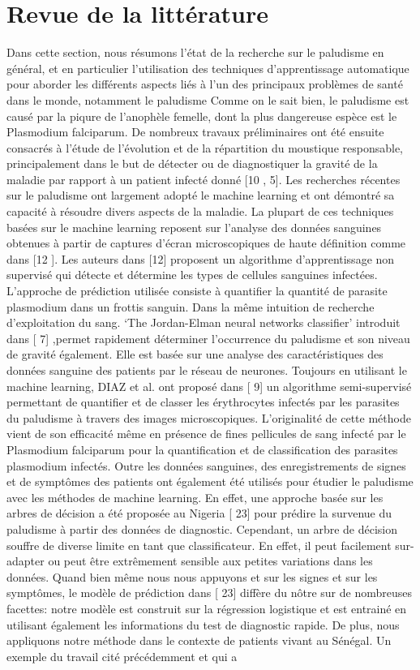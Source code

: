 \section{Revue de la littérature}\label{Revue de la littérature}
Dans cette section, nous résumons l’état de la recherche sur le paludisme en général, et en particulier l’utilisation des techniques d’apprentissage automatique pour aborder les différents aspects liés à l’un des principaux problèmes de santé dans le monde, notamment le paludisme
Comme on le sait bien, le paludisme est causé par la piqure de l’anophèle femelle, dont la plus dangereuse espèce est le Plasmodium falciparum. De nombreux travaux préliminaires ont été ensuite consacrés à l’étude de l’évolution et de la répartition du moustique responsable, principalement dans le but de détecter ou de diagnostiquer la gravité de la maladie par rapport à un patient infecté donné [10 , 5]. Les recherches récentes sur le paludisme ont largement adopté le machine learning et ont démontré sa capacité à résoudre divers aspects de la maladie. La plupart de ces techniques basées sur le machine learning reposent sur l'analyse des données sanguines obtenues à partir de captures d'écran microscopiques de haute définition comme dans [12 ]. Les auteurs dans [12] proposent un algorithme d'apprentissage non supervisé qui détecte et détermine les types de cellules sanguines infectées. L’approche de prédiction utilisée consiste à quantifier la quantité de parasite plasmodium dans un frottis sanguin. Dans la même intuition de recherche d’exploitation du sang. ‘The Jordan-Elman neural networks classifier’ introduit dans [ 7] ,permet rapidement déterminer l'occurrence du paludisme et son niveau de gravité également. Elle est basée sur une analyse des caractéristiques des données sanguine des patients par le réseau de neurones. Toujours en utilisant le machine learning, DIAZ et al. ont proposé dans [ 9] un algorithme semi-supervisé permettant de quantifier et de classer les érythrocytes infectés par les parasites du paludisme à travers des images microscopiques. L'originalité de cette méthode vient de son efficacité même en présence de fines pellicules de sang infecté par le Plasmodium falciparum pour la quantification et de classification des parasites plasmodium infectés. Outre les données sanguines, des enregistrements de signes et de symptômes des patients ont également été utilisés pour étudier le paludisme avec les méthodes  de machine learning. En effet, une approche basée sur les arbres de décision a été proposée au Nigeria [ 23] pour prédire la survenue du paludisme à partir des données de diagnostic. Cependant, un arbre de décision souffre de diverse limite en tant que classificateur. En effet, il peut facilement sur-adapter ou peut être extrêmement sensible aux petites variations dans les données. Quand bien même nous nous appuyons et sur les signes et sur les symptômes, le modèle de prédiction dans [ 23] diffère du nôtre sur de nombreuses facettes: notre modèle est construit sur la régression logistique et est entrainé  en utilisant également les informations du test de diagnostic rapide. De plus, nous appliquons notre méthode dans le contexte de patients vivant au Sénégal. Un exemple du travail cité précédemment et qui a 